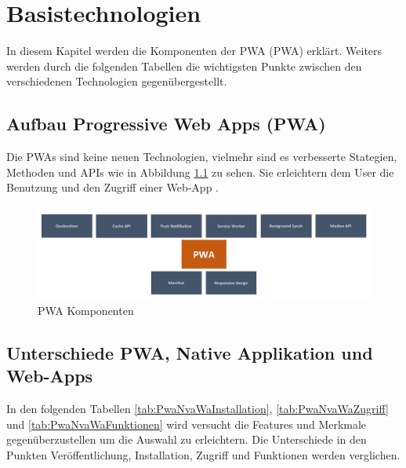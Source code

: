\chapter{Basistechnologien}\label{chab:Basistechnologien}
\thispagestyle{standard}
\pagestyle{standard}
\renewcommand{\footrulewidth}{0.4pt}
In diesem Kapitel werden die Komponenten der \acl{PWA} (\acs{PWA}) erklärt. Weiters werden durch die folgenden Tabellen die wichtigsten Punkte zwischen den verschiedenen Technologien  gegenübergestellt.

\section{Aufbau Progressive Web Apps (PWA)}
Die \acs{PWA}s sind keine neuen Technologien, vielmehr sind es verbesserte Stategien, Methoden und APIs wie in Abbildung \ref{fig:Komponenten} zu sehen. 
Sie erleichtern dem User die Benutzung und den Zugriff einer \acs{Web-App} \cite{AlternativePWA}. 

\begin{figure}[h]
	\centering
	\includegraphics[width=14cm]{BilderAllgemein/PWA_Features}\medskip
	\caption{PWA Komponenten}
	\label{fig:Komponenten}
\end{figure}

\section{Unterschiede PWA, Native Applikation und Web-Apps}\label{chap:UnterschiedePWA,NativeApplikationundWeb-Apps}
In den folgenden Tabellen \ref{tab:PwaNvaWaInstallation}, \ref{tab:PwaNvaWaZugriff} und \ref{tab:PwaNvaWaFunktionen}  wird versucht die Features und Merkmale gegenüberzustellen um die Auswahl zu erleichtern. Die Unterschiede in den Punkten Veröffentlichung, Installation, Zugriff und Funktionen werden verglichen.


